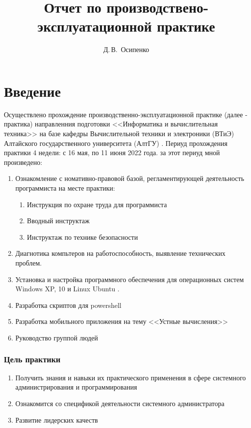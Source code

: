 \documentclass[14pt, oneside]{altsu-report}
\title{Отчет по производствено-эксплуатационной практике}
\author{Д.\,В.~Осипенко}
\institute{Институт цифровых технологий, электроники и физики}
\date{\the\year}
\begin{document}
\maketitle

\setcounter{page}{2}
\tableofcontents

\chapter*{Введение}
Осуществлено прохождение производственно-эксплуатационной практике (далее - практика) направленния подготовки <<Информатика и вычислительная техника>> на базе кафедры Вычислительной техники и электроники (ВТиЭ) Алтайского государственного университета (АлтГУ) \cite{asu}.  
Периуд прохождения практики 4 недели: с 16 мая, по 11 июня 2022 года. за этот периуд мной произведено:
\begin{enumerate}
  \item Ознакомление с номативно-правовой базой, регламентирующей деятельность программиста на месте практики:
  \begin{enumerate}
    \item Инструкция по охране труда для программиста \cite{asuProgrammer}
    \item Вводный инструктаж
    \item Инструктаж по технике безопасности
  \end{enumerate}
  \item Диагнотика компьтеров на работоспособность, выявление технических проблем.
  \item Установка и настройка программного обеспечения для операционных систем Windows XP, 10 \cite{wikiWindows} и Linux Ubuntu \cite{ubuntu}.
  \item Разработка скриптов для powershell \cite{powershell}
  \item Разработка мобильного приложения на тему <<Устные вычисления>> \cite{mentalMath}
  \item Руководство группой людей
\end{enumerate} 

\subsection*{Цель практики}
\begin{enumerate}
  \item Получить знания и навыки их практического применения в сфере системного администрирования и программирования
  \item Ознакомится со спецификой деятельности системного администратора
  \item Развитие лидерских качеств
\end{enumerate}
\end{document}
